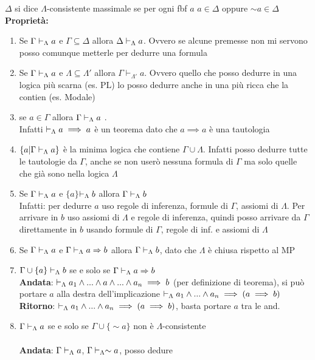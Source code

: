 $\Delta${ si dice $\Lambda$}-consistente massimale se per ogni fbf
$a${ $a\in\Delta$} oppure $\sim a\in\Delta$ $ $\\




\textbf{Proprietà:}
\begin{enumerate}
\item Se $\teoa$ e $\Gamma\subseteq\Delta$ allora $\Delta\teorema a$.
Ovvero se alcune premesse non mi servono posso comunque metterle per
dedurre una formula
\item Se $\teorGamma a$ e $\Lambda\subseteq\Lambda'$ allora $\Gamma\vdash_{\Lambda'}a$.
Ovvero quello che posso dedurre in una logica più scarna (es. PL)
lo posso dedurre anche in una più ricca che la contien (es. Modale)
\item se $a\in\Gamma$ allora $\teoa$ . \\
Infatti $\teorema{a\implies a}$ è un teorema dato che $a\implies a$
è una tautologia
\item $\{a|\teoa\}$ è la minima logica che contiene $\Gamma\cup\Lambda$.
Infatti posso dedurre tutte le tautologie da $\Gamma$, anche se non
userò nessuna formula di $\Gamma$ ma solo quelle che già sono nella
logica $\Lambda$
\item Se $\teoa$ e $\{a\}$$\teorema b$ allora $\teorGamma b$ \\
Infatti: per dedurre $a$ uso regole di inferenza, formule di $\Gamma$,
assiomi di $\Lambda$. Per arrivare in $b$ uso assiomi di $\Lambda$
e regole di inferenza, quindi posso arrivare da $\Gamma$ direttamente
in $b$ usando formule di $\Gamma$, regole di inf. e assiomi di $\Lambda$
\item Se $\teoa$ e $\teorGamma{\implica ab}$ allora $\teorGamma b$, dato
che $\Lambda$ è chiusa rispetto al MP
\item $\Gamma\cup\{a\}\teorema b$ se e solo se $\teorGamma{\implica ab}$
\\
\textbf{Andata}: $\teorema{a_{1}\wedge...\wedge a\wedge...\wedge}a_{n}\implies b$
(per definizione di teorema), si può portare $a$ alla destra dell'implicazione
$\teorema{a_{1}\wedge...\wedge}a_{n}\implies(a\implies b)$ \\
\textbf{Ritorno}: $\teorema{a_{1}\wedge}...\wedge a_{n}\implies(a\implies b)$,
basta portare $a$ tra le $ $and.
\item $\teoa$ se e solo se $\Gamma\cup\{\sim a\}$ non è $\Lambda$-consistente
\\
\\
\textbf{Andata}: $\teoa$, $\Gamma\teorema{\sim a}$, posso dedure
$$
\end{enumerate}
